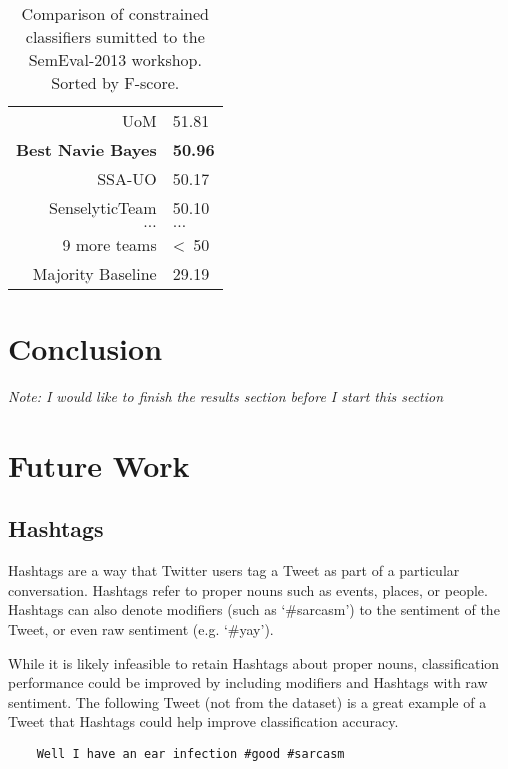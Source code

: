 \documentclass[12pt]{article}
\begin{document}
\begin{table}[H]
\begin{center}
\begin{tabular}{|r|l|}
        UoM        & 51.81 \\
        \textbf{Best Navie Bayes}& \textbf{50.96} \\
        SSA-UO     & 50.17 \\
        SenselyticTeam & 50.10 \\
        $\ldots$   & $\ldots$ \\
        9 more teams &  \textless\ 50 \\
        \hline
        Majority Baseline & 29.19 \\
        \hline
    \end{tabular}
    \end{center}
    \caption{Comparison of constrained classifiers sumitted to the SemEval-2013
        workshop. Sorted by F-score.}
    \label{table:comparison}
\end{table}

\section{Conclusion}

\textit{Note: I would like to finish the results section before I start this section }


\section{Future Work}

\subsection{Hashtags}

Hashtags are a way that Twitter users tag a Tweet as part of a particular
conversation. Hashtags refer to proper nouns such as events, places, or people.
Hashtags can also denote modifiers (such as `\#sarcasm') to the sentiment of the
Tweet, or even raw sentiment (e.g. `\#yay').

While it is likely infeasible to retain Hashtags about proper nouns,
classification performance could be improved by including modifiers and
Hashtags with raw sentiment. The following Tweet (not from the dataset) is a
great example of a Tweet that Hashtags could help improve classification
accuracy.

\begin{verbatim}
    Well I have an ear infection #good #sarcasm
\end{verbatim}
\end{document}
